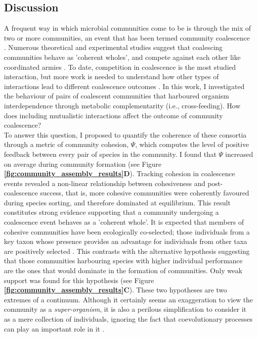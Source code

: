 \documentclass[titlepage,11pt]{article}
\begin{document}
\begin{linenumbers}
\begin{singlespace}
		\section{Discussion}
			A frequent way in which microbial communities come to be is through the mix of two or more communities, an event that has been termed community coalescence  \citep{Rillig2015}. Numerous theoretical and experimental studies suggest that coalescing communities behave as 'coherent wholes', and compete against each other like coordinated armies \citep{Gilpin1994, Toquenaga1997, Livingston2013, Tikhonov2016, Tikhonov2017, Sierocinski2017, Lu2018}. To date, competition in coalescence is the most studied interaction, but more work is needed to understand how other types of interactions lead to different coalescence outcomes \citep{Castledine2020}. In this work, I investigated the behaviour of pairs of coalescent communities  that harboured organism interdependence through metabolic complementarity (i.e., cross-feeding). How does including mutualistic interactions affect the outcome of community coalescence?\\
			To answer this question, I proposed to quantify the coherence of these consortia through a metric of community cohesion, $ \Psi $, which computes the level of positive feedback between every pair of species in the community. I found that $ \Psi $ increased on average  during community formation (see Figure \textbf{\ref{fig:community_assembly_results}D}). Tracking cohesion in coalescence events revealed a non-linear relationship between cohesiveness and post-coalescence success, that is, more cohesive communities were coherently favoured during species sorting, and therefore dominated at equilibrium. This result constitutes strong evidence supporting that a community undergoing a coalescence event behaves as a 'coherent whole'. It is expected that members of cohesive communities have been ecologically co-selected; those individuals from a key taxon whose presence provides an advantage for individuals from other taxa are positively selected \citep{Sierocinski2017}. This contrasts with the alternative hypothesis suggesting that those communities harbouring species with higher individual performance are the ones that would dominate in the formation of communities. Only weak support was found for this hypothesis (see Figure \textbf{\ref{fig:community_assembly_results}C}). These two hypotheses are two extremes of a continuum. Although it certainly seems an exaggeration to view the community as a \textit{super-organism}, it is also a perilous simplification to consider it as a mere collection of individuals, ignoring the fact that coevolutionary processes can play an important role in it \citep{Rillig2017}.\\

\end{singlespace}
\end{linenumbers}
\end{document}
